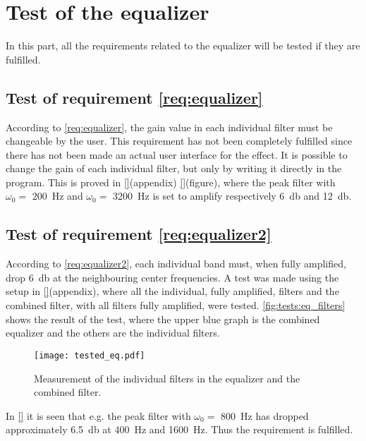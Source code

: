\section{Test of the equalizer}
In this part, all the requirements related to the equalizer will be tested if they are fulfilled. 


\subsection{Test of requirement \autoref{req:equalizer}}
According to \autoref{req:equalizer}, the gain value in each individual filter must be changeable by the user. This requirement has not been completely fulfilled since there has not been made an actual user interface for the effect. It is possible to change the gain of each individual filter, but only by writing it directly in the program. This is proved in \autoref{}(appendix) \autoref{}(figure), where the peak filter with $\omega_0 =$ \SI{200}{\hertz} and $\omega_0 =$ \SI{3200}{\hertz} is set to amplify respectively \SI{6}{\decibel} and \SI{12}{\decibel}. 




\subsection{Test of requirement \autoref{req:equalizer2}}
According to \autoref{req:equalizer2}, each individual band must, when fully amplified, drop \SI{6}{\decibel} at the neighbouring center frequencies. A test was made using  the setup in \autoref{}(appendix), where all the individual, fully amplified, filters and the combined filter, with all filters fully amplified, were tested. \autoref{fig:tests:eq_filters} shows the result of the test, where the upper blue graph is the combined equalizer and the others are the individual filters.

\begin{figure}[htbp!]
    \centering
        \texttt{[image: tested\_eq.pdf]}
        \caption{Measurement of the individual filters in the equalizer and the combined filter.}
        \label{fig:tests:eq_filters}
  \end{figure}
  
 In \autoref{}  it is seen that e.g. the peak filter with $\omega_0 =$ \SI{800}{\hertz} has dropped approximately \SI{6.5}{\decibel} at \SI{400}{\hertz} and \SI{1600}{\hertz}. Thus the requirement is fulfilled. 

